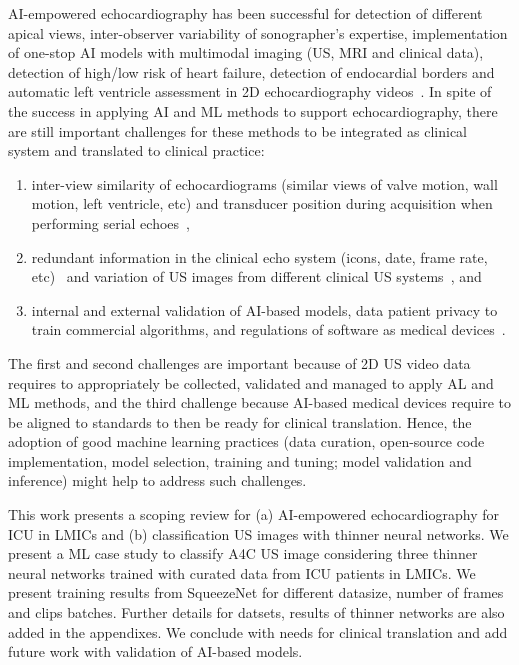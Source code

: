 \documentclass[mlabstract,twocolumn]{jmlr}
\begin{document}
AI-empowered echocardiography has been successful for detection of different apical views, inter-observer variability of sonographer's expertise, implementation of one-stop AI models with multimodal imaging (US, MRI and clinical data), detection of high/low risk of heart failure, detection of endocardial borders and automatic left ventricle assessment in 2D echocardiography videos~\citep{tromp2022, zhang2022-mdpi, behnami2020, ono2022}.
In spite of the success in applying AI and ML methods to support echocardiography, there are still important challenges for these methods to be integrated as clinical system and translated to clinical practice:
\begin{enumerate}
\setlength\itemsep{0em}
\item inter-view similarity of echocardiograms (similar views of valve motion, wall motion, left ventricle, etc) and transducer position during acquisition when performing serial echoes~\citep{zhang2018},
\item redundant information in the clinical echo system (icons, date, frame rate, etc)~\citep{khamis2017} and variation of US images from different clinical US systems~\citep{brindise2020unsupervised}, and
\item internal and external validation of AI-based models, data patient privacy to train commercial algorithms, and regulations of software as medical devices~\citep{2022_Stewart_Emergency_Medicine_Australasia}.
\end{enumerate}
The first and second challenges are important because of 2D US video data requires to appropriately be collected, validated and managed to apply AL and ML methods, and the third challenge because AI-based medical devices require to be aligned to standards to then be ready for clinical translation.
Hence, the adoption of good machine learning practices (data curation, open-source code implementation, model selection, training and tuning; model validation and inference) might help to address such challenges.

This work presents a scoping review for (a) AI-empowered echocardiography for ICU in LMICs and (b) classification US images with thinner neural networks.
We present a ML case study to classify A4C US image considering three thinner neural networks trained with curated data from ICU patients in LMICs.
We present training results from SqueezeNet for different datasize, number of frames and clips batches. 
Further details for datsets, results of thinner networks are also added in the appendixes.
We conclude with needs for clinical translation and add future work with validation of AI-based models. 
\end{document}
